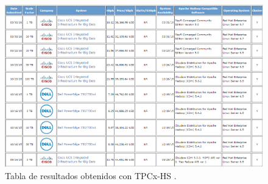 \documentclass[10pt]{article}
\begin{document}
			
	\begin{figure}[H]
		\centering
		\includegraphics[width=15cm]{./images/examples.png}
		\caption{Tabla de resultados obtenidos con TPCx-HS \cite{ejemplos}.} 
		\label{fig:ejemplo}
	\end{figure}
\end{document}
